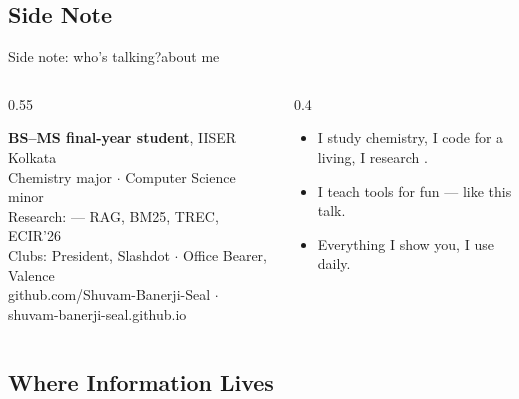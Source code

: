 \subsection{Side Note}

\begin{frame}{Side note: who's talking?}{about me}
    \begin{columns}
        \begin{column}{0.55\textwidth}
            \begin{tcolorbox}[darkstyle,title={\tiny Shuvam Banerji Seal}]
                {\small
                \textbf{BS--MS final-year student}, IISER Kolkata\\[0.1em]
                Chemistry major $\cdot$ Computer Science minor\\[0.2em]
                Research:  --- RAG, BM25, TREC, ECIR'26\\[0.2em]
                Clubs: President, Slashdot $\cdot$ Office Bearer, Valence\\[0.2em]
                {\tiny\color{softgray} github.com/Shuvam-Banerji-Seal $\cdot$ shuvam-banerji-seal.github.io}
                }
            \end{tcolorbox}
        \end{column}
        \begin{column}{0.4\textwidth}
            \pause\begin{itemize}[<+->]
                \item I study chemistry, I code for a living, I research .
                \item I teach tools for fun --- like this talk.
                \item Everything I show you, I use daily.
            \end{itemize}
        \end{column}
    \end{columns}
\end{frame}

\subsection{Where Information Lives}

